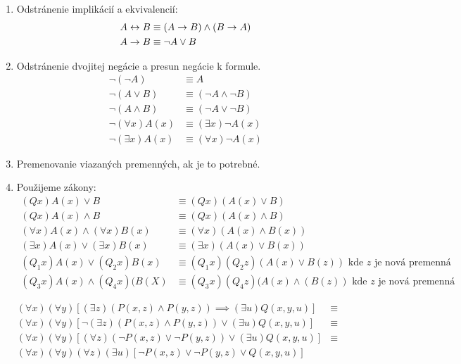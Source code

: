 \begin{enumerate}
\item Odstránenie implikácií a ekvivalencií:
    \begin{align*}
        A \leftrightarrow B &\equiv (A \rightarrow B) \land (B \rightarrow A) \\
        A \rightarrow B &\equiv \neg A \lor B
    \end{align*}

\item Odstránenie dvojitej negácie a presun negácie k formule.
    \begin{align*}
        \neg (\neg A) &\equiv A \\
        \neg (A \lor B) &\equiv (\neg A \land \neg B) \\
        \neg (A \land B) &\equiv (\neg A \lor \neg B) \\
        \neg (\forall x) A(x) &\equiv (\exists x) \neg A(x) \\
        \neg (\exists x) A(x) &\equiv (\forall x) \neg A(x)
    \end{align*}

\item  Premenovanie viazaných premenných, ak je to potrebné.

\item Použijeme zákony:
    \begin{align*}
        (Q x) A(x) \lor B &\equiv (Q x)(A(x) \lor B) \\
        (Q x)A(x) \land B &\equiv (Q x)(A(x) \land B) \\
        (\forall x) A(x) \land (\forall x)B(x) &\equiv 
            (\forall x)(A(x) \land B(x)) \\
        (\exists x)A(x) \lor (\exists x)B(x) &\equiv 
            (\exists x) (A(x)\lor B(x)) \\
        (Q_1 x) A(x) \lor (Q_2 x)B(x) &\equiv
            (Q_1 x)(Q_2 z) (A(x)\lor B(z)) \mbox{ kde $z$ je nová
            premenná} \\
        (Q_3 x) A(x) \land (Q_4 x)(B(X) &\equiv 
            (Q_3 x)(Q_4 z)(A(x) \land (B(z)) \mbox{ kde $z$ je nová
            premenná}
    \end{align*}
\end{enumerate}

\begin{priklad}
    \begin{align*}
        (\forall x)(\forall y) \left[ (\exists z) \left(P(x,z) \land
            P(y,z)\right) \implies (\exists u) Q(x,y,u) \right] &\equiv \\
        (\forall x)(\forall y)\left[\neg (\exists z)(P(x,z)\land 
            P(y,z))\lor(\exists u)Q(x,y,u)\right] &\equiv \\
        (\forall x)(\forall y)\left[(\forall z)(\neg P(x,z)\lor 
            \neg P(y,z))\lor(\exists u)Q(x,y,u)\right] &\equiv \\
        (\forall x)(\forall y)(\forall z)(\exists u) \left[ \neg P(x,z) \lor 
            \neg P(y,z) \lor Q(x,y,u) \right] &
    \end{align*}
\end{priklad}
